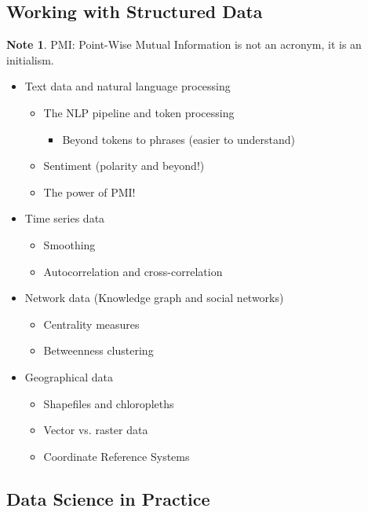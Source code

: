 \documentclass[11pt]{article}
\theoremstyle{definition}
\newtheorem{note}{Note}
\begin{document}
\subsection{Working with Structured Data}
\begin{note}
  PMI: Point-Wise Mutual Information is not an acronym, it is an initialism.
\end{note}
\begin{itemize}
  \item Text data and natural language processing
  \begin{itemize}
    \item The NLP pipeline and token processing
    \begin{itemize}
      \item Beyond tokens to phrases (easier to understand)
    \end{itemize}
    \item Sentiment (polarity and beyond!)
    \item The power of PMI!
  \end{itemize}
  \item Time series data
  \begin{itemize}
    \item Smoothing
    \item Autocorrelation and cross-correlation
  \end{itemize}
  \item Network data (Knowledge graph and social networks)
  \begin{itemize}
    \item Centrality measures
    \item Betweenness clustering
  \end{itemize}
  \item Geographical data
  \begin{itemize}
    \item Shapefiles and chloropleths
    \item Vector vs. raster data
    \item Coordinate Reference Systems
  \end{itemize}
\end{itemize}
\subsection{Data Science in Practice}
\end{document}
